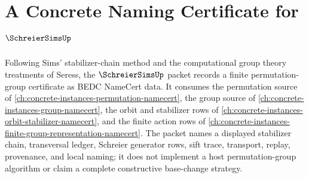 \chapter{A Concrete Naming Certificate for $\SchreierSimsUp$}
\label{ch:concrete-instances-schreier-sims-namecert}

Following Sims' stabilizer-chain method and the computational group theory treatments of Seress, the $\SchreierSimsUp$ packet records a finite permutation-group certificate as BEDC NameCert data. It consumes the permutation source of \autoref{ch:concrete-instances-permutation-namecert}, the group source of \autoref{ch:concrete-instances-group-namecert}, the orbit and stabilizer rows of \autoref{ch:concrete-instances-orbit-stabilizer-namecert}, and the finite action rows of \autoref{ch:concrete-instances-finite-group-representation-namecert}. The packet names a displayed stabilizer chain, transversal ledger, Schreier generator rows, sift trace, transport, replay, provenance, and local naming; it does not implement a host permutation-group algorithm or claim a complete constructive base-change strategy.


